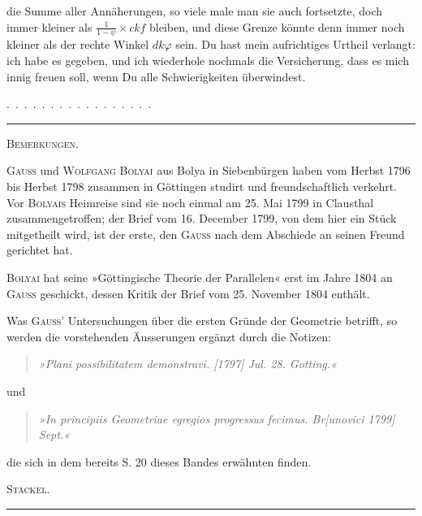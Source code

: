die Summe aller Annäherungen, so viele male man sie auch fortsetzte,
doch immer kleiner als $\frac{1}{1-\psi} \times ckf$ bleiben, und
diese Grenze könnte denn immer noch kleiner als der rechte Winkel
$dk\varphi$ sein. Du hast mein aufrichtiges Urtheil verlangt: ich
habe es gegeben, und ich wiederhole nochmals die Versicherung, dass
es mich innig freuen soll, wenn Du alle Schwierigkeiten überwindest.

.\, .\, .\, .\, .\, .\, .\, .\, .\, .\, .\, .\, .\, .\, .\, .\, .

\medskip
\begin{center}
\rule{0.3\textwidth}{0.4pt}
\end{center}
\medskip

\begin{center}
\textsc{Bemerkungen.}
\end{center}

\textsc{Gauss} und \textsc{Wolfgang Bolyai} aus Bolya in
Siebenbürgen haben vom Herbst 1796 bis Herbst 1798 zusammen in
Göttingen studirt und freundschaftlich verkehrt. Vor
\textsc{Bolyais} Heimreise sind sie noch einmal am 25. Mai 1799 in
Clausthal zusammengetroffen; der Brief vom 16. December 1799, von
dem hier ein Stück mitgetheilt wird, ist der erste, den \textsc{Gauss}
nach dem Abschiede an seinen Freund gerichtet hat.

\textsc{Bolyai} hat seine »Göttingische Theorie der Parallelen« erst im Jahre 1804 an \textsc{Gauss} geschickt, dessen
Kritik der Brief vom 25. November 1804 enthält.

Was \textsc{Gauss}’ Untersuchungen über die ersten Gründe der
Geometrie betrifft, so werden die vorstehenden Äusserungen ergänzt
durch die Notizen:

\begin{quote}
\emph{»Plani possibilitatem demonstravi. [1797] Jul. 28. Gotting.«}
\end{quote}
und
\begin{quote}
\emph{»In principiis Geometriae egregios progressus fecimus.
Br[unovici 1799] Sept.«}
\end{quote}
die sich in dem bereits S. 20 dieses Bandes erwähnten 
finden.

\begin{flushright}
\textsc{Stäckel.}
\end{flushright}

\medskip
\begin{center}
\rule{0.3\textwidth}{0.4pt}
\end{center}
